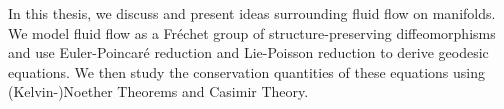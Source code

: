 
\noindent
In this thesis, we discuss and present ideas surrounding fluid flow on manifolds. We model fluid flow as a Fr\'echet group of structure-preserving diffeomorphisms and use Euler-Poincar\'e reduction and Lie-Poisson reduction to derive geodesic equations. We then study the conservation quantities of these equations using (Kelvin-)Noether Theorems and Casimir Theory.